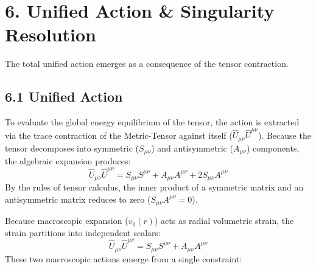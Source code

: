 








\section*{6. Unified Action \& Singularity Resolution}
The total unified action emerges as a consequence of the tensor contraction.

\subsection*{6.1 Unified Action}
To evaluate the global energy equilibrium of the tensor, the action is extracted via the trace contraction of the Metric-Tensor against itself ($\hat{U}_{\mu\nu} \hat{U}^{\mu\nu}$). Because the tensor decomposes into symmetric ($S_{\mu\nu}$) and antisymmetric ($A_{\mu\nu}$) components, the algebraic expansion produces:
\begin{equation}
    \hat{U}_{\mu\nu} \hat{U}^{\mu\nu} = S_{\mu\nu} S^{\mu\nu} + A_{\mu\nu} A^{\mu\nu} + 2S_{\mu\nu} A^{\mu\nu}
\end{equation}
By the rules of tensor calculus, the inner product of a symmetric matrix and an antisymmetric matrix reduces to zero ($S_{\mu\nu} A^{\mu\nu} = 0$). 

Because macroscopic expansion ($v_0(r)$) acts as radial volumetric strain, the strain partitions into independent scalars:
\begin{equation}
    \hat{U}_{\mu\nu} \hat{U}^{\mu\nu} = S_{\mu\nu} S^{\mu\nu} + A_{\mu\nu} A^{\mu\nu}
\end{equation}
These two macroscopic actions emerge from a single constraint:

